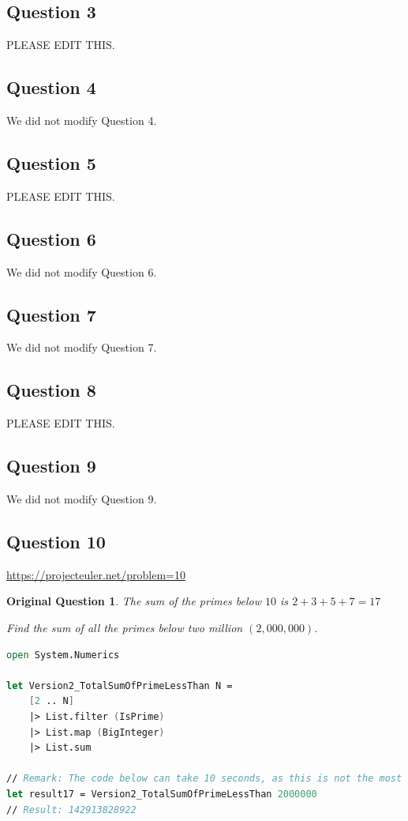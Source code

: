 \documentclass[12pt]{article}
\newtheorem*{origQuestion*}{Original Question}
\begin{document}
\subsection*{Question 3} 
PLEASE EDIT THIS.
\subsection*{Question 4} 
We did not modify Question 4.
\subsection*{Question 5} 
PLEASE EDIT THIS.
\subsection*{Question 6} 
We did not modify Question 6.
\subsection*{Question 7} 
We did not modify Question 7.
\subsection*{Question 8} 
PLEASE EDIT THIS.
\subsection*{Question 9} 
We did not modify Question 9.
\subsection*{Question 10} 
\url{https://projecteuler.net/problem=10}
\begin{origQuestion*}
The sum of the primes below $10$ is $2 + 3 + 5 + 7 = 17$

Find the sum of all the primes below two million $(2,000,000)$.
\end{origQuestion*}

\begin{lstlisting}[language=FSharp]
open System.Numerics

let Version2_TotalSumOfPrimeLessThan N =
    [2 .. N]
    |> List.filter (IsPrime)
    |> List.map (BigInteger)
    |> List.sum

// Remark: The code below can take 10 seconds, as this is not the most optimal algorithm.
let result17 = Version2_TotalSumOfPrimeLessThan 2000000
// Result: 142913828922
\end{lstlisting}
\end{document}
